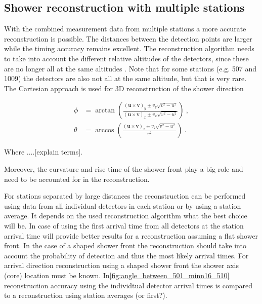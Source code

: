 \subsection{Shower reconstruction with multiple stations}

With the combined measurement data from multiple stations a more accurate reconstruction is possible. The distances between the detection points are larger while the timing accuracy remains excellent. The reconstruction algorithm needs to take into account the different relative altitudes of the detectors, since these are no longer all at the same altitudes \cite{steijger2012direction}. Note that for some stations (e.g. 507 and 1009) the detectors are also not all at the same altitude, but that is very rare. The Cartesian approach is used for 3D reconstruction of the shower direction \cite{montanus2015direction}

\begin{equation}
    \label{eq:direction3dflat}
    \begin{split}
        \phi &= \arctan \left(\frac{(\mathbf{u} \times \mathbf{v})_y \pm v_y \sqrt{v^2-u^2}}{(\mathbf{u} \times \mathbf{v})_x \pm v_x \sqrt{v^2-u^2}}\right) \ , \\
        \theta & = \arccos \left( \frac{(\mathbf{u} \times \mathbf{v})_z \pm v_z \sqrt{v^2-u^2}}{v^2}\right) \ .
    \end{split}
\end{equation}

Where ....[explain terms].

Moreover, the curvature and rise time of the shower front play a big role and need to be accounted for in the reconstruction. 

For stations separated by large distances the reconstruction can be performed using data from all individual detectors in each station or by using a station average. It depends on the used reconstruction algorithm what the best choice will be. In case of using the first arrival time from all detectors at the station arrival time will provide better results for a reconstruction assuming a flat shower front. In the case of a shaped shower front the reconstruction should take into account the probability of detection and thus the most likely arrival times. For arrival direction reconstruction using a shaped shower front the shower axis (core) location must be known. In\cref{fig:angle_between_501_minn16_510} reconstruction accuracy using the individtual detector arrival times is compared to a reconstruction using station averages (or first?). 

